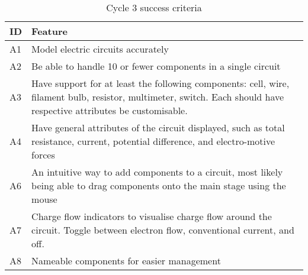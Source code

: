 \begin{table}[!h]
    \centering
    \begin{tabular}{@{}lp{400pt}@{}} \toprule
        \textbf{ID} & \textbf{Feature} \\ \midrule 
        A1 & Model electric circuits accurately \\ 
        A2 & Be able to handle 10 or fewer components in a single circuit \\ 
        A3 & Have support for at least the following components: cell, wire, filament bulb, resistor, multimeter, switch. Each should have respective attributes be customisable. \\ 
        A4 & Have general attributes of the circuit displayed, such as total resistance, current, potential difference, and electro-motive forces \\ 
        A6 & An intuitive way to add components to a circuit, most likely being able to drag components onto the main stage using the mouse \\ 
        A7 & Charge flow indicators to visualise charge flow around the circuit. Toggle between electron flow, conventional current, and off. \\ 
        A8 & Nameable components for easier management \\ 
        \bottomrule
    \end{tabular}
    \caption{Cycle 3 success criteria}
    \label{tbl:succ-crit-c3}
\end{table}